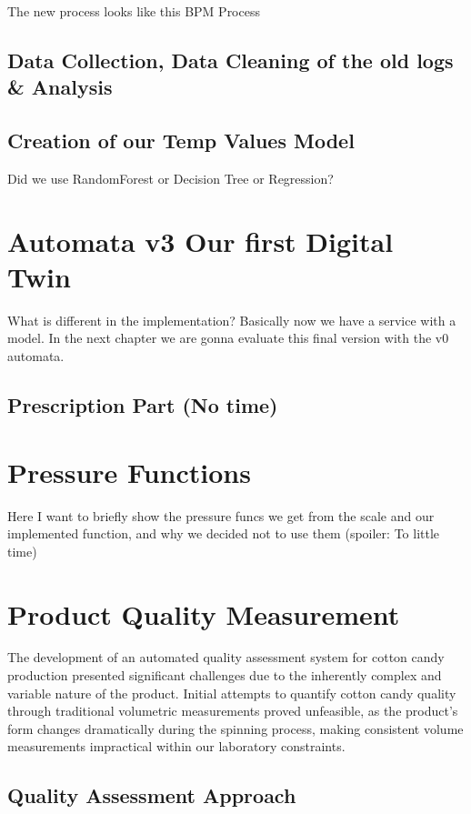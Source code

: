 The new process looks like this 
BPM Process
\subsection{Data Collection, Data Cleaning of the old logs \& Analysis}
\subsection{Creation of our Temp Values Model}
Did we use RandomForest or Decision Tree or Regression?




\section{Automata v3 Our first Digital Twin}
What is different in the implementation? Basically now we have a service with a model. In the next chapter we are gonna evaluate this final version with the v0 automata.

\subsection{Prescription Part (No time)}



\section{Pressure Functions}
Here I want to briefly show the pressure funcs we get from the scale and our implemented function, and why we decided not to use them (spoiler: To little time)


\section{Product Quality Measurement}
The development of an automated quality assessment system for cotton candy production presented significant challenges due to the inherently complex and variable nature of the product. Initial attempts to quantify cotton candy quality through traditional volumetric measurements proved unfeasible, as the product's form changes dramatically during the spinning process, making consistent volume measurements impractical within our laboratory constraints.

\subsection{Quality Assessment Approach}

